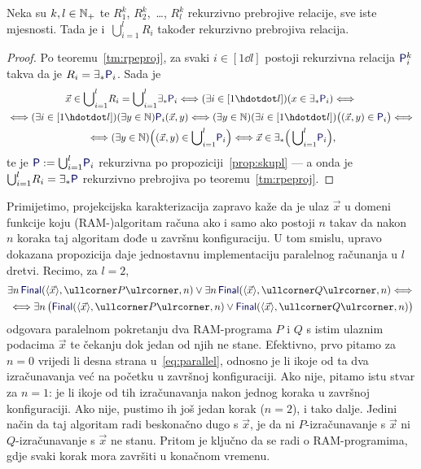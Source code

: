 \begin{propozicija}[{name=[rekurzivna prebrojivost unije rekurzivno prebrojivih relacija]}]\label{pp:unlre}
Neka su $k,l\in{\mathbb N}_+$ te $R_1^k$, $R_2^k$,~\ldots, $R_l^k$ rekurzivno prebrojive relacije, sve iste mjesnosti. Tada je i\, $\bigcup_{i=1}^l\! R_i$ također rekurzivno prebrojiva relacija.
\end{propozicija}
\begin{proof}
Po teoremu~\ref{tm:rpeproj}, za svaki $i\in[1\dd l]$ postoji rekurzivna relacija $\f P^k_i$ takva da je $R_i=\exists_*\f P_i$. Sada je
\begin{multline}\label{eq:urere}
    \vec x\in\bigcup\nolimits_{i=1}^l\! R_i=\bigcup\nolimits_{i=1}^l\!\exists_*\f P_i\Longleftrightarrow
    (\exists i\in[1\dd l])(x\in\exists_*\f P_i)\Longleftrightarrow{}\\
    {}\Longleftrightarrow(\exists i\in[1\dd l])(\exists y\in\N)\f P_i(\vec x,y)\Longleftrightarrow(\exists y\in\N)(\exists i\in[1\dd l])\bigl((\vec x,y)\in\f P_i\bigr)\Longleftrightarrow{}\\
    {}\Longleftrightarrow
    (\exists y\in\N)\Bigl((\vec x,y)\in\bigcup\nolimits_{i=1}^l\!\f P_i\Bigr)\Longleftrightarrow\vec x\in\exists_*\Bigl(\,\bigcup\nolimits_{i=1}^l\!\f P_i\Bigr)\text,
\end{multline}
te je $\f P:=\bigcup_{i=1}^l\!\f P_i$ rekurzivna po propoziciji~\ref{prop:skupl} --- a onda je $\bigcup_{i=1}^l\! R_i=\exists_*\f P$ rekurzivno prebrojiva po teoremu~\ref{tm:rpeproj}.
\end{proof}

Primijetimo, projekcijska karakterizacija zapravo kaže da je ulaz $\vec x$ u domeni funkcije koju (RAM-\!)algoritam računa ako i samo ako postoji $n$ takav da nakon $n$ koraka taj algoritam dođe u završnu konfiguraciju. U tom smislu, upravo dokazana propozicija daje jednostavnu implementaciju paralelnog računanja u $l$ dretvi. Recimo, za $l=2$,
\begin{multline}\label{eq:parallel}
    \exists n\,\f{Final}(\kr{\vec x},\kprog P,n)\lor\exists n\,\f{Final}(\kr{\vec x},\kprog Q,n)\Longleftrightarrow{}\\
    {}\Longleftrightarrow\exists n\,\bigl(\f{Final}(\kr{\vec x},\kprog P,n)\lor\f{Final}(\kr{\vec x},\kprog Q,n)\bigr)
\end{multline}
odgovara paralelnom pokretanju dva RAM-programa $P$ i $Q$ s istim ulaznim podacima $\vec x$ te čekanju dok jedan od njih ne stane. Efektivno, prvo pitamo za $n=0$ vrijedi li desna strana u~\eqref{eq:parallel}, odnosno je li ikoje od ta dva izračunavanja već na početku u završnoj konfiguraciji. Ako nije, pitamo istu stvar za $n=1$: je li ikoje od tih izračunavanja nakon jednog koraka u završnoj konfiguraciji. Ako nije, pustimo ih još jedan korak ($n=2$), i tako dalje. Jedini način da taj algoritam radi beskonačno dugo s $\vec x$, je da ni $P$-izračunavanje s $\vec x$ ni $Q$-izračunavanje s $\vec x$ ne stanu. Pritom je ključno da se radi o RAM-programima, gdje svaki korak mora završiti u konačnom vremenu.

